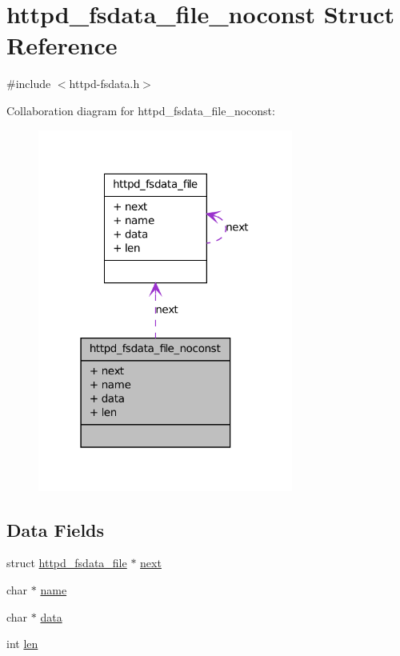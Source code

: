 \hypertarget{structhttpd__fsdata__file__noconst}{
\section{httpd\_\-fsdata\_\-file\_\-noconst Struct Reference}
\label{structhttpd__fsdata__file__noconst}
}


{\ttfamily \#include $<$httpd-\/fsdata.h$>$}



Collaboration diagram for httpd\_\-fsdata\_\-file\_\-noconst:
\nopagebreak
\begin{figure}[H]
\begin{center}
\leavevmode
\includegraphics[width=238pt]{structhttpd__fsdata__file__noconst__coll__graph}
\end{center}
\end{figure}
\subsection*{Data Fields}
\begin{DoxyCompactItemize}
\item 
struct \hyperlink{structhttpd__fsdata__file}{httpd\_\-fsdata\_\-file} $\ast$ \hyperlink{structhttpd__fsdata__file__noconst_aae7beec96cf003b15d8c365202c66405}{next}
\item 
char $\ast$ \hyperlink{structhttpd__fsdata__file__noconst_a63e0ed72114a600a6996a7d8255f16a0}{name}
\item 
char $\ast$ \hyperlink{structhttpd__fsdata__file__noconst_aad8f44eb77b6118f6ef8c19d20e15bae}{data}
\item 
int \hyperlink{structhttpd__fsdata__file__noconst_a48dc8b78bacc34fe5eff4a3b348cb13f}{len}
\end{DoxyCompactItemize}


